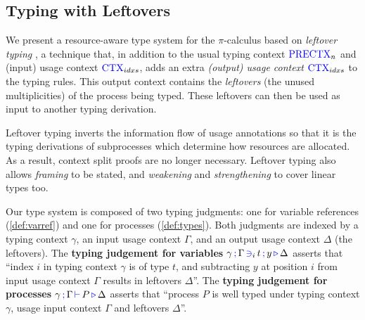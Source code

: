 \documentclass[runningheads]{llncs}
\newcommand{\picalc}{$\pi$-calculus}
\newcommand{\type}[1]{\textcolor{blue}{\operatorname{#1}}}
\newcommand{\types}[4]{#1 \, \type{;} \, #2 \, \type{\vdash} \, #3 \, \type{\triangleright} \, #4}
\newcommand{\contains}[6]{#1 \, \type{;} \, #2 \, \type{\ni}_{#3} \, #4 \, \type{;} \, #5 \, \type{\triangleright} \, #6}
\newcommand{\PreCtx}{\type{PRECTX}}
\newcommand{\Ctx}{\type{CTX}}
\begin{document}
\subsection{Typing with Leftovers}
\label{leftover-typing}

We present a resource-aware type system for the \picalc{} based on \emph{leftover typing} \cite{Allais2018a}, a technique that, in addition to the usual typing context $\PreCtx_n$ and (input) usage context $\Ctx_{idxs}$, adds an extra \emph{(output) usage context} $\Ctx_{idxs}$ to the typing rules.
This output context contains the \emph{leftovers} (the unused multiplicities) of the process being typed.
These leftovers can then be used as input to another typing derivation.

Leftover typing inverts the information flow of usage annotations so that it is the typing derivations of subprocesses which determine how resources are allocated.
As a result, context split proofs are no longer necessary.
Leftover typing also allows \emph{framing} to be stated, and \emph{weakening} and \emph{strengthening} to cover linear types too.

Our type system is composed of two typing judgments: one for variable references (\autoref{def:varref}) and one for processes (\autoref{def:types}).
Both judgments are indexed by a typing context $\gamma$, an input usage context $\Gamma$, and an output usage context $\Delta$ (the leftovers).
The \textbf{typing judgement for variables} $\contains{\gamma}{\Gamma}{i}{t}{y}{\Delta}$ asserts that ``index $i$ in typing context $\gamma$ is of type $t$, and subtracting $y$ at position $i$ from input usage context $\Gamma$ results in leftovers $\Delta$''.
The \textbf{typing judgement for processes} $\types{\gamma}{\Gamma}{P}{\Delta}$ asserts that ``process $P$ is well typed under typing context $\gamma$, usage input context $\Gamma$ and leftovers $\Delta$''.
\end{document}
